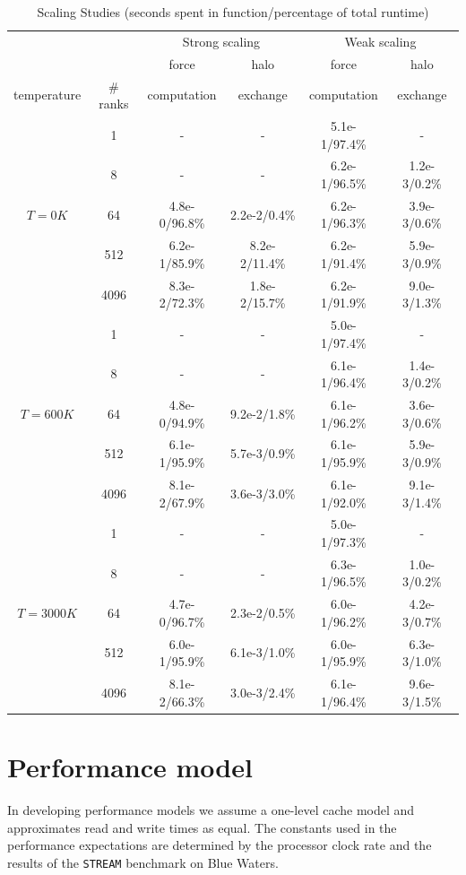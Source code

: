 \documentclass[12pt]{article}
\begin{document}
\begin{table}[h!]
\centering
\begin{tabular}{c c | c c | c c}
\toprule
& \multicolumn{1}{c}{} & \multicolumn{2}{c}{Strong scaling} & \multicolumn{2}{c}{Weak scaling} \\
\cmidrule(r){3-4} \cmidrule(r){5-6}
\multicolumn{1}{c}{} & \multicolumn{1}{c}{}  & \multicolumn{1}{c}{force} & \multicolumn{1}{c}{halo} & \multicolumn{1}{c}{force} & \multicolumn{1}{c}{halo} \\
\multicolumn{1}{c}{temperature} & \multicolumn{1}{c}{\# ranks} & \multicolumn{1}{c}{computation} & \multicolumn{1}{c}{exchange} & \multicolumn{1}{c}{computation} & \multicolumn{1}{c}{exchange} \\
\midrule
 & 1 & - & - & 5.1e-1/97.4\% & - \\ 
& 8 & - & - & 6.2e-1/96.5\% & 1.2e-3/0.2\% \\ 
$T = 0 K$ & 64 & 4.8e-0/96.8\% & 2.2e-2/0.4\% & 6.2e-1/96.3\% & 3.9e-3/0.6\% \\ 
& 512 & 6.2e-1/85.9\% & 8.2e-2/11.4\% & 6.2e-1/91.4\% & 5.9e-3/0.9\% \\ 
& 4096 & 8.3e-2/72.3\% & 1.8e-2/15.7\% & 6.2e-1/91.9\% & 9.0e-3/1.3\% \\ 
\midrule
 & 1 & - & - & 5.0e-1/97.4\% & - \\ 
& 8 & - & - & 6.1e-1/96.4\% & 1.4e-3/0.2\% \\ 
$T = 600 K$ & 64 & 4.8e-0/94.9\% & 9.2e-2/1.8\% & 6.1e-1/96.2\% & 3.6e-3/0.6\% \\ 
& 512 & 6.1e-1/95.9\% & 5.7e-3/0.9\% & 6.1e-1/95.9\% & 5.9e-3/0.9\% \\ 
& 4096 & 8.1e-2/67.9\% & 3.6e-3/3.0\% & 6.1e-1/92.0\% & 9.1e-3/1.4\% \\ 
\midrule
 & 1 & - & - & 5.0e-1/97.3\% & - \\ 
& 8 & - & - & 6.3e-1/96.5\% & 1.0e-3/0.2\% \\ 
$T = 3000 K$ & 64 & 4.7e-0/96.7\% & 2.3e-2/0.5\% & 6.0e-1/96.2\% & 4.2e-3/0.7\% \\ 
& 512 & 6.0e-1/95.9\% & 6.1e-3/1.0\% & 6.0e-1/95.9\% & 6.3e-3/1.0\% \\ 
& 4096 & 8.1e-2/66.3\% & 3.0e-3/2.4\% & 6.1e-1/96.4\% & 9.6e-3/1.5\% \\ 
\bottomrule
\end{tabular}
\caption{Scaling Studies (seconds spent in function/percentage of total runtime)}
\label{tbl:times}
\end{table}

\section{Performance model}
In developing performance models we assume a one-level cache model and
approximates read and write times as equal.  The constants used in the
performance expectations are determined by the processor clock rate
and the results of the \texttt{STREAM} benchmark on Blue Waters.
\\
\end{document}
